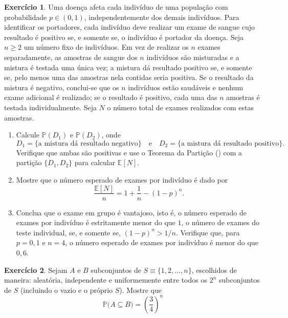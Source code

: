 \documentclass[12pt,portuguese]{article}
\theoremstyle{definition}
\newtheorem{exercise}{Exercício}
\begin{document}
\begin{exercise}\label{exercise:teste-sangue-grupo}
Uma doença afeta cada indivíduo de uma população com probabilidade
\(p \in (0,1)\), independentemente dos demais indivíduos. Para identificar os
portadores, cada indivíduo deve realizar um exame de sangue cujo resultado é
positivo se, e somente se, o indivíduo é portador da doença. Seja
\(n \geqslant 2\) um número fixo de indivíduos. Em vez de realizar os \(n\)
exames separadamente, as amostras de sangue dos \(n\) indivíduos são
misturadas e a mistura é testada uma única vez; a mistura dá resultado
positivo se, e somente se, pelo menos uma das amostras nela contidas seria
positiva. Se o resultado da mistura é negativo, conclui-se que os \(n\)
indivíduos estão saudáveis e nenhum exame adicional é realizado; se o
resultado é positivo, cada uma das \(n\) amostras é testada
individualmente. Seja \(N\) o número total de exames realizados com estas
amostras.
\begin{enumerate}[label=(\alph*)]
  \item Calcule \(\mathbb{P}(D_1)\) e \(\mathbb{P}(D_2)\), onde
        \[D_1 = \{\text{a mistura dá resultado negativo}\}\quad \text{e} \quad 
        D_2 = \{\text{a mistura dá resultado positivo}\}.\] 
        Verifique que
        ambas são positivas e use o Teorema da Partição
        () com a partição \(\{D_1, D_2\}\)
        para calcular \(\mathbb{E}[N]\).
  \item Mostre que o número esperado de exames por indivíduo é dado por
        \[
        \frac{\mathbb{E}[N]}{n} = 1 + \frac{1}{n} - (1-p)^n.
        \]
  \item Conclua que o exame em grupo é vantajoso, isto é, o número esperado
        de exames por indivíduo é estritamente menor do que \(1\), o número
        de exames do teste individual, se, e somente se,
        \((1-p)^n > 1/n\). Verifique que, para \(p = 0{,}1\) e \(n = 4\),
        o número esperado de exames por indivíduo é menor do que \(0{,}6\).
\end{enumerate}
\end{exercise}


\begin{exercise}
Sejam $A$ e $B$ subconjuntos de $S\equiv \{1,2,...,n\}$, escolhidos de maneira:
aleatória, independente e uniformemente entre todos os $2^n$ subconjuntos de 
$S$ (incluindo o vazio e o próprio $S$). Mostre que 
$$ 
\mathbb{P}\bigl({A\subseteq B}\bigr) = \left(\frac{3}{4}\right)^n
$$
\end{exercise}
\end{document}
